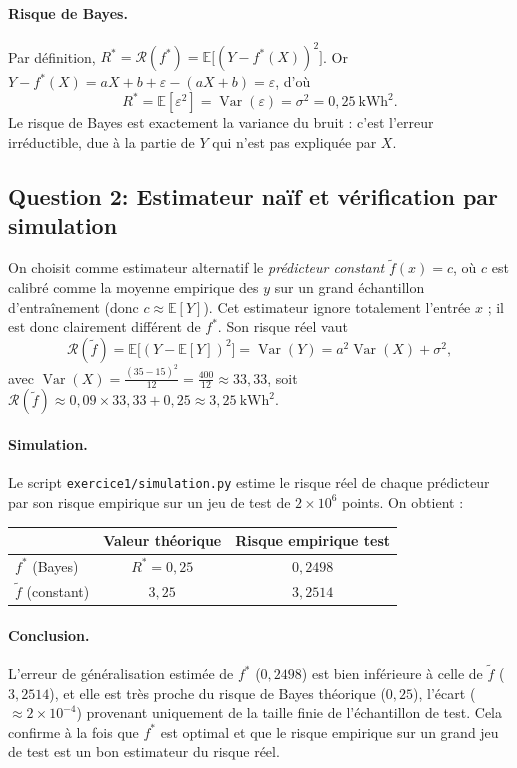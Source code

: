 \documentclass[11pt,a4paper]{article}
\newcommand{\E}{\mathbb{E}}
\newcommand{\fstar}{f^{*}}
\newcommand{\Risk}{\mathcal{R}}
\DeclareMathOperator{\Var}{Var}
\theoremstyle{plain}
\begin{document}
\paragraph{Risque de Bayes.} Par définition, $R^{*}=\Risk(\fstar)=\E\big[(Y-\fstar(X))^2\big]$.
Or $Y-\fstar(X)=aX+b+\varepsilon-(aX+b)=\varepsilon$, d'où
\[
    \boxed{\,R^{*}=\E[\varepsilon^2]=\Var(\varepsilon)=\sigma^2=0{,}25~\text{kWh}^2.\,}
\]
Le risque de Bayes est exactement la variance du bruit : c'est l'erreur
irréductible, due à la partie de $Y$ qui n'est pas expliquée par $X$.

\subsection*{Question 2: Estimateur naïf et vérification par simulation}

On choisit comme estimateur alternatif le \emph{prédicteur constant}
$\tilde f(x)=c$, où $c$ est calibré comme la moyenne empirique des $y$ sur un
grand échantillon d'entraînement (donc $c\approx\E[Y]$). Cet estimateur ignore
totalement l'entrée $x$ ; il est donc clairement différent de $\fstar$. Son
risque réel vaut
\[
    \Risk(\tilde f)=\E\big[(Y-\E[Y])^2\big]=\Var(Y)
                  =a^2\Var(X)+\sigma^2 ,
\]
avec $\Var(X)=\frac{(35-15)^2}{12}=\frac{400}{12}\approx 33{,}33$, soit
$\Risk(\tilde f)\approx 0{,}09\times 33{,}33+0{,}25\approx 3{,}25~\text{kWh}^2$.

\paragraph{Simulation.} Le script \texttt{exercice1/simulation.py} estime le
risque réel de chaque prédicteur par son risque empirique sur un jeu de test de
$2\times10^{6}$ points. On obtient :

\begin{center}
\begin{tabular}{lcc}
\toprule
 & Valeur théorique & Risque empirique test \\
\midrule
$\fstar$ (Bayes)        & $R^{*}=0{,}25$ & $0{,}2498$ \\
$\tilde f$ (constant)   & $3{,}25$       & $3{,}2514$ \\
\bottomrule
\end{tabular}
\end{center}

\paragraph{Conclusion.} L'erreur de généralisation estimée de $\fstar$
($0{,}2498$) est bien inférieure à celle de $\tilde f$ ($3{,}2514$), et elle est
très proche du risque de Bayes théorique ($0{,}25$), l'écart
($\approx 2\times10^{-4}$) provenant uniquement de la taille finie de
l'échantillon de test. Cela confirme à la fois que $\fstar$ est optimal et que
le risque empirique sur un grand jeu de test est un bon estimateur du risque
réel.
\end{document}
